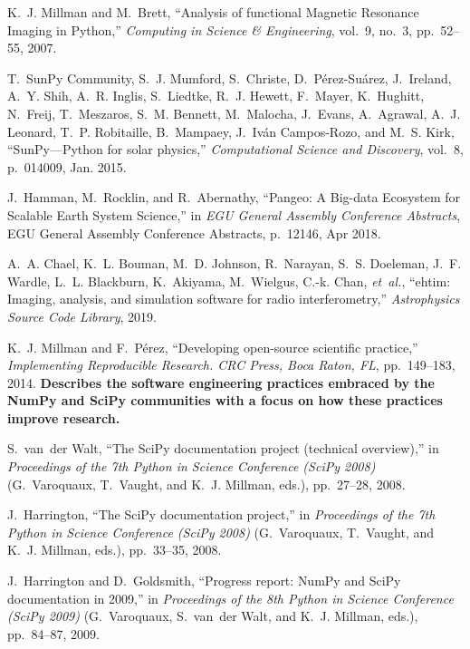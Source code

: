 \documentclass[twocolumn]{article}
\begin{document}
\begin{thebibliography}{10}
K.~J. Millman and M.~Brett, ``Analysis of functional {Magnetic Resonance
  Imaging} in {P}ython,'' {\em Computing in Science \& Engineering}, vol.~9,
  no.~3, pp.~52--55, 2007.

T.~{SunPy Community}, S.~J. {Mumford}, S.~{Christe}, D.~{P{\'e}rez-Su{\'a}rez},
  J.~{Ireland}, A.~Y. {Shih}, A.~R. {Inglis}, S.~{Liedtke}, R.~J. {Hewett},
  F.~{Mayer}, K.~{Hughitt}, N.~{Freij}, T.~{Meszaros}, S.~M. {Bennett},
  M.~{Malocha}, J.~{Evans}, A.~{Agrawal}, A.~J. {Leonard}, T.~P. {Robitaille},
  B.~{Mampaey}, J.~{Iv{\'a}n Campos-Rozo}, and M.~S. {Kirk}, ``{SunPy---Python
  for solar physics},'' {\em Computational Science and Discovery}, vol.~8,
  p.~014009, Jan. 2015.

J.~{Hamman}, M.~{Rocklin}, and R.~{Abernathy}, ``{Pangeo: A Big-data Ecosystem
  for Scalable Earth System Science},'' in {\em EGU General Assembly Conference
  Abstracts}, EGU General Assembly Conference Abstracts, p.~12146, Apr 2018.

A.~A. Chael, K.~L. Bouman, M.~D. Johnson, R.~Narayan, S.~S. Doeleman, J.~F.
  Wardle, L.~L. Blackburn, K.~Akiyama, M.~Wielgus, C.-k. Chan, {\em et~al.},
  ``ehtim: Imaging, analysis, and simulation software for radio
  interferometry,'' {\em Astrophysics Source Code Library}, 2019.

K.~J. Millman and F.~P{\'e}rez, ``Developing open-source scientific practice,''
  {\em Implementing Reproducible Research. CRC Press, Boca Raton, FL},
  pp.~149--183, 2014.
\newblock \newline \textbf{Describes the software engineering practices
  embraced by the NumPy and SciPy communities with a focus on how these
  practices improve research.}

S.~van~der Walt, ``The {SciPy} documentation project (technical overview),'' in
  {\em Proceedings of the 7th {P}ython in Science Conference (SciPy 2008)}
  (G.~Varoquaux, T.~Vaught, and K.~J. Millman, eds.), pp.~27--28, 2008.

J.~Harrington, ``The {SciPy} documentation project,'' in {\em Proceedings of
  the 7th {P}ython in Science Conference (SciPy 2008)} (G.~Varoquaux,
  T.~Vaught, and K.~J. Millman, eds.), pp.~33--35, 2008.

J.~Harrington and D.~Goldsmith, ``Progress report: {NumPy} and {SciPy}
  documentation in 2009,'' in {\em Proceedings of the 8th {P}ython in Science
  Conference (SciPy 2009)} (G.~Varoquaux, S.~van~der Walt, and K.~J. Millman,
  eds.), pp.~84--87, 2009.


\end{thebibliography}
\end{document}
